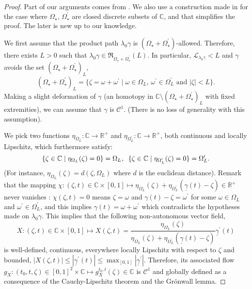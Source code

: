 \documentclass[11pt, english]{smfart}
\theoremstyle{definition}
\begin{document}
\begin{proof}
Part of our arguments comes from \cite{OU012, Del014}. We also use a
construction made in \cite{S012, S014} for the case where $\Omega_\star$,
$\Omega_\star^\prime$ are closed discrete subsets of $\mathbb{C}$,
and that simplifies the proof. The later is new up to our knowledge.

We first assume that the product path $\lambda_0 \gamma$ is 
$(\Omega_\star+\Omega_\star^\prime)$-allowed. Therefore, there exists
$L>0$ such that $\lambda_0 \gamma \in \mathfrak{R}_{\Omega_\star+
\Omega_\star^\prime}(L)$. In particular, $\mathcal{L}_{\lambda_0
\gamma} <L$ and $\gamma$ avoids the
set $(\Omega_\star + \Omega_\star^\prime)_L$,
$$(\Omega_\star + \Omega_\star^\prime)_L =  \{\zeta =
\omega+\omega^\prime \mid \omega \in \Omega_L, \, \omega^\prime \in
\Omega^\prime_L \mbox{ and } |\zeta| <L \}.$$
Making a slight deformation of $\gamma$ (an homotopy in
$\mathbb{C} \setminus (\Omega_\star + \Omega_\star^\prime)_L$ with
fixed extremities), we can assume that $\gamma$ is
$\mathcal{C}^1$. (There is no loss of generality with this assumption).

We pick two functions $\eta_{\Omega_L} : \mathbb{C} \to \mathbb{R}^+$ and 
$\eta_{\Omega_L^\prime} : \mathbb{C} \to  \mathbb{R}^+$, both
continuous and locally Lipschitz,  which furthermore satisfy: 
$$\{\zeta \in \mathbb{C} \mid
\eta_{\Omega_L}(\zeta)=0\} = \Omega_L, \hspace{2mm} \{\zeta \in \mathbb{C} \mid
\eta_{\Omega_L^\prime}(\zeta)=0\} = \Omega_L^\prime .$$
(For instance, $\eta_{\Omega_L}(\zeta) = d(\zeta,\Omega_L)$ where $d$
is the euclidean distance).  Remark that the mapping 
$\chi : (\zeta,t) \in \mathbb{C} \times [0,1] \mapsto
\eta_{\Omega_L}(\zeta)+\eta_{\Omega_L^\prime}(\underline{\gamma}(t)-
\zeta) \in  \mathbb{R}^+$ never vanishes : $\chi(\zeta,t)=0$ means 
$\zeta=\omega$ and $\gamma(t)-\zeta = \omega^\prime$ for some 
$\omega \in  \Omega_L$ and $\omega^\prime \in \Omega_L^\prime$, and
this implies $\gamma(t) = \omega + \omega^\prime$ which contradicts
the hypotheses made on 
$\lambda_0 \gamma$. This implies that the following non-autonomous vector
field,
$$X : (\zeta,t) \in \mathbb{C} \times [0,1] \mapsto X(\zeta,t) =
\frac{\eta_{\Omega_L}(\zeta)}{\eta_{\Omega_L}(\zeta)+\eta_{\Omega_L^\prime}(\underline{\gamma}(t)- 
  \zeta)}\underline{\gamma}^\prime (t)$$ 
is well-defined, continuous, everywhere locally Lipschitz with respect to
$\zeta$   and  bounded, $|X(\zeta,t)| \leq
|\underline{\gamma}^\prime (t)| \leq
\max_{[0,1]}|\underline{\gamma}^\prime|$. Therefore, its associated flow  ${ g_X :
  (t_0,t,\zeta) \in [0,1]^2\times 
\mathbb{C} \mapsto  g_X^{t_0,t}(\zeta) \in \mathbb{C} }$ is
$\mathcal{C}^1$ and globally defined as a consequence of the
Cauchy-Lipschitz theorem and the Gr\"onwall lemma.


\end{proof}
\end{document}
